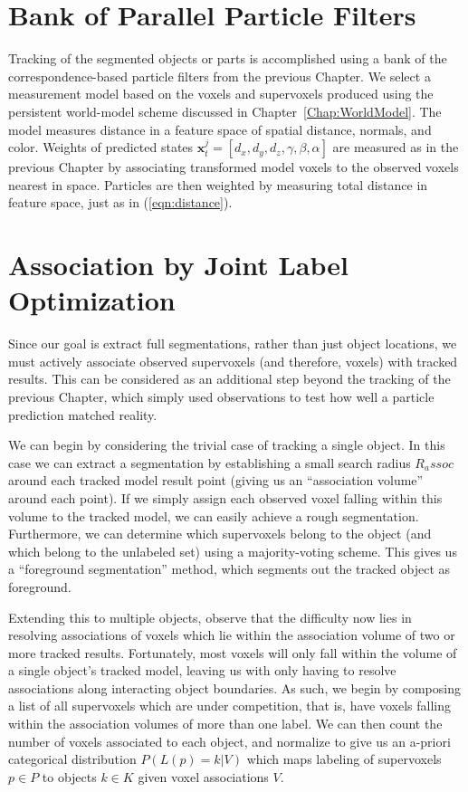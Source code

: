 \section{Bank of Parallel Particle Filters}
Tracking of the segmented objects or parts is accomplished using a bank of the correspondence-based particle filters from the previous Chapter. We select a measurement model based on the voxels and supervoxels produced using the persistent world-model scheme discussed in Chapter~\ref{Chap:WorldModel}. The model measures distance in a feature space of spatial distance, normals, and color. Weights of predicted states $\mathbf{x}^j_t = [d_x, d_y, d_z, \gamma, \beta, \alpha]$ are measured as in the previous Chapter by associating transformed model voxels to the observed voxels nearest in space. Particles are then weighted by measuring total distance in feature space, just as in (\ref{eqn:distance}).

\section{Association by Joint Label Optimization}
Since our goal is extract full segmentations, rather than just object locations, we must actively associate observed supervoxels (and therefore, voxels) with tracked results. This can be considered as an additional step beyond the tracking of the previous Chapter, which simply used observations to test how well a particle prediction matched reality. 

We can begin by considering the trivial case of tracking a single object. In this case we can extract a segmentation by establishing a small search radius $R_assoc$ around each tracked model result point (giving us an ``association volume'' around each point). If we simply assign each observed voxel falling within this volume to the tracked model, we can easily achieve a rough segmentation. Furthermore, we can determine which supervoxels belong to the object (and which belong to the unlabeled set) using a majority-voting scheme. This gives us a ``foreground segmentation'' method, which segments out the tracked object as foreground. 


Extending this to multiple objects, observe that the difficulty now lies in resolving associations of voxels which lie within the association volume of two or more tracked results. Fortunately, most voxels will only fall within the volume of a single object's tracked model, leaving us with only having to resolve associations along interacting object boundaries. As such, we begin by composing a list of all supervoxels which are under competition, that is, have voxels falling within the association volumes of more than one label. We can then count the number of voxels associated to each object, and normalize to give us an a-priori categorical distribution ${P}(L(p) = k | V )$ which maps labeling of supervoxels $p \in P$  to objects $k \in K$ given voxel associations $V$.  

